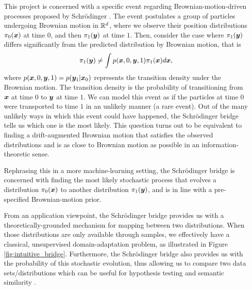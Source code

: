 \documentclass[a4paper,12pt,twoside,openright]{report}
\theoremstyle{definition}
\begin{document}
 This project is concerned with a specific event regarding Brownian-motion-driven processes proposed by Schrödinger \citep{schrodinger1931uber, schrodinger1932theorie}. The event postulates a group of particles undergoing Brownian motion in ${\mathbb{R}}^d$, where we observe their position distributions $\pi_0({\bm{x}})$ at time $0$, and then $\pi_1({\bm{y}})$ at time $1$. Then, consider the case where $\pi_1({\bm{y}})$ differs significantly from the predicted distribution by Brownian motion, that is
 \begin{align*}
     \pi_1({\bm{y}}) \neq \int p({\bm{x}}, 0, {\bm{y}} , 1) \pi_1({\bm{x}}) d{\bm{x}},
 \end{align*}
 where $p({\bm{x}}, 0, {\bm{y}} , 1) = p({\bm{y}}_1| {\bm{x}}_0)$ represents the transition density under the Brownian motion. The transition density is the probability of transitioning from ${\bm{x}}$ at time $0$ to ${\bm{y}}$ at time $1$. We can model this event as if the particles at time $0$ were transported to time $1$ in an unlikely manner (a rare event). Out of the many unlikely ways in which this event could have happened, the Schrödinger bridge tells us which one is the most likely. This question turns out to be equivalent to finding a drift-augmented Brownian motion that satisfies the observed distributions and is as close to Brownian motion as possible in an information-theoretic sense.
 
 Rephrasing this in a more machine-learning setting, the Schrödinger bridge is concerned with finding the most likely stochastic process that evolves a distribution $\pi_0({\bm{x}})$ to another distribution $\pi_1({\bm{y}})$, and is in line with a pre-specified Brownian-motion prior.
 
 From an application viewpoint, the Schrödinger bridge provides us with a theoretically-grounded mechanism for mapping between two distributions. When those distributions are only available through samples, we effectively have a classical, unsupervised domain-adaptation problem, as illustrated in Figure \ref{fig:intuitive_bridge}. Furthermore, the Schrödinger bridge also provides us with the probability of this stochastic evolution, thus allowing us to compare two data sets/distributions which can be useful for hypothesis testing \citep{gretton2012kernel,ramdas2017wasserstein} and semantic similarity \citep{vargas2019model}.
 
\end{document}
